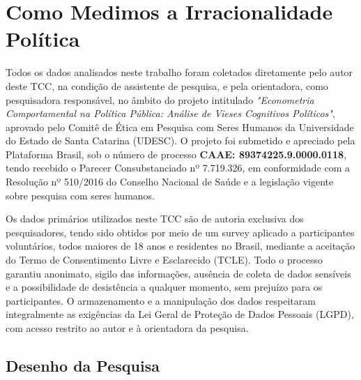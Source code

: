 \chapter{Como Medimos a Irracionalidade Política}
\label{capitulo_3}

Todos os dados analisados neste trabalho foram coletados diretamente pelo autor deste TCC, na condição de assistente de pesquisa, e pela orientadora, como pesquisadora responsável, no âmbito do projeto intitulado \textit{"Econometria Comportamental na Política Pública: Análise de Vieses Cognitivos Políticos"}, aprovado pelo Comitê de Ética em Pesquisa com Seres Humanos da Universidade do Estado de Santa Catarina (UDESC). O projeto foi submetido e apreciado pela Plataforma Brasil, sob o número de processo \textbf{CAAE: 89374225.9.0000.0118}, tendo recebido o Parecer Consubstanciado nº 7.719.326, em conformidade com a Resolução nº 510/2016 do Conselho Nacional de Saúde e a legislação vigente sobre pesquisa com seres humanos.

Os dados primários utilizados neste TCC são de autoria exclusiva dos pesquisadores, tendo sido obtidos por meio de um survey aplicado a participantes voluntários, todos maiores de 18 anos e residentes no Brasil, mediante a aceitação do Termo de Consentimento Livre e Esclarecido (TCLE). Todo o processo garantiu anonimato, sigilo das informações, ausência de coleta de dados sensíveis e a possibilidade de desistência a qualquer momento, sem prejuízo para os participantes. O armazenamento e a manipulação dos dados respeitaram integralmente as exigências da Lei Geral de Proteção de Dados Pessoais (LGPD), com acesso restrito ao autor e à orientadora da pesquisa.

\section{Desenho da Pesquisa}

